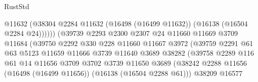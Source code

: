 \begin{lexlean}{RustStd}
\begin{coremodule}
                                            @11632
                                            (@38304
                                              @2284
                                              @11632
                                              (@16498 (@16499 @11632))
                                              (@16138 (@16504 @2284 @24))))))
                                      (@39739
                                        @2293
                                        @2300
                                        @2307
                                        @24
                                        @11660
                                        @11669
                                        @3709
                                        @11684
                                        (@39750
                                          @2292
                                          @330
                                          @228
                                          @11660
                                          @11667
                                          @3972
                                          (@39759
                                            @2291
                                            @61
                                            @63
                                            @5123
                                            @11659
                                            @11666
                                            @3739
                                            @11640
                                            @3689
                                            @38282
                                            (@39758
                                              @2289
                                              @116
                                              @61
                                              @14
                                              @11656
                                              @3709
                                              @3702
                                              @3739
                                              @11650
                                              @3689
                                              (@38242
                                                @2288
                                                @11656
                                                (@16498 (@16499 @11656))
                                                (@16138 (@16504 @2288 @61)))
                                              @38209
                                              @16577

\end{coremodule}
\end{lexlean}
